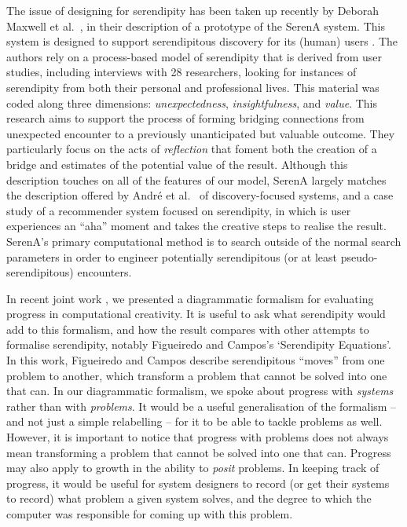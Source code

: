 The issue of designing for serendipity has been taken up recently by
Deborah Maxwell et al.~\citeyear{maxwell2012designing}, in their
description of a prototype of the {\sf SerenA} system.  This system is
designed to support serendipitous discovery for its (human) users
\cite{forth2013serena}.  The authors rely on a process-based model of
serendipity \cite{Makri2012,Makri2012a} that is derived from user
studies, including interviews with 28 researchers, looking for
instances of serendipity from both their personal and professional
lives.  This material was coded along three dimensions:
\emph{unexpectedness}, \emph{insightfulness}, and \emph{value}.  This
research aims to support the process of forming bridging connections
from unexpected encounter to a previously unanticipated but valuable
outcome.  They particularly focus on the acts of \emph{reflection}
that foment both the creation of a bridge and estimates of the
potential value of the result.
%
Although this description touches on all of the features of our model, {\sf
  SerenA} largely matches the description offered by Andr{\'e} et
al.~\citeyear{andre2009discovery} of discovery-focused systems, and a
case study of a recommender system focused on serendipity, in which
is user experiences an ``aha'' moment and takes the
creative steps to realise the result.  {\sf SerenA}'s primary computational method is to
search outside of the normal search parameters in order to engineer
potentially serendipitous (or at least pseudo-serendipitous)
encounters.

In recent joint work \cite{colton-assessingprogress}, we presented a
diagrammatic formalism for evaluating progress in computational
creativity.  It is useful to ask what serendipity would add to this
formalism, and how the result compares with other attempts to
formalise serendipity, notably Figueiredo and Campos's
\citeyear{Figueiredo2001} `Serendipity Equations'.  In this work,
Figueiredo and Campos describe serendipitous ``moves'' from one
problem to another, which transform a problem that cannot be solved
into one that can.  In our diagrammatic formalism, we spoke about
progress with \emph{systems} rather than with \emph{problems}.  It
would be a useful generalisation of the formalism -- and not just a
simple relabelling -- for it to be able to tackle problems as well.
However, it is important to notice that progress with problems does not always mean transforming a
problem that cannot be solved into one that can.  Progress may also
apply to growth in the ability to \emph{posit} problems.  In keeping
track of progress, it would be useful for system designers to record
(or get their systems to record) what problem a given system solves,
and the degree to which the computer was responsible for coming up
with this problem.

